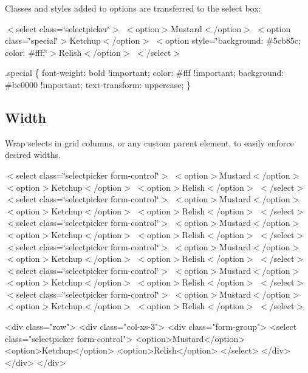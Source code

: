 Classes and styles added to options are transferred to the select box\+:

 $<$select class=\char`\"{}selectpicker\char`\"{}$>$ $<$option$>$Mustard$<$/option$>$ $<$option class=\char`\"{}special\char`\"{}$>$Ketchup$<$/option$>$ $<$option style=\char`\"{}background\+: \#5cb85c; color\+: \#fff;\char`\"{}$>$Relish$<$/option$>$ $<$/select$>$ 





\begin{DoxyCode}
.special \{
  font-weight: bold !important;
  color: #fff !important;
  background: #bc0000 !important;
  text-transform: uppercase;
\}
\end{DoxyCode}


\subsection*{Width}

Wrap selects in grid columns, or any custom parent element, to easily enforce desired widths.

    $<$select class=\char`\"{}selectpicker form-\/control\char`\"{}$>$ $<$option$>$Mustard$<$/option$>$ $<$option$>$Ketchup$<$/option$>$ $<$option$>$Relish$<$/option$>$ $<$/select$>$     $<$select class=\char`\"{}selectpicker form-\/control\char`\"{}$>$ $<$option$>$Mustard$<$/option$>$ $<$option$>$Ketchup$<$/option$>$ $<$option$>$Relish$<$/option$>$ $<$/select$>$       $<$select class=\char`\"{}selectpicker form-\/control\char`\"{}$>$ $<$option$>$Mustard$<$/option$>$ $<$option$>$Ketchup$<$/option$>$ $<$option$>$Relish$<$/option$>$ $<$/select$>$     $<$select class=\char`\"{}selectpicker form-\/control\char`\"{}$>$ $<$option$>$Mustard$<$/option$>$ $<$option$>$Ketchup$<$/option$>$ $<$option$>$Relish$<$/option$>$ $<$/select$>$       $<$select class=\char`\"{}selectpicker form-\/control\char`\"{}$>$ $<$option$>$Mustard$<$/option$>$ $<$option$>$Ketchup$<$/option$>$ $<$option$>$Relish$<$/option$>$ $<$/select$>$     $<$select class=\char`\"{}selectpicker form-\/control\char`\"{}$>$ $<$option$>$Mustard$<$/option$>$ $<$option$>$Ketchup$<$/option$>$ $<$option$>$Relish$<$/option$>$ $<$/select$>$    


\begin{DoxyCode}
<div class="row">
  <div class="col-xs-3">
    <div class="form-group">
      <select class="selectpicker form-control">
        <option>Mustard</option>
        <option>Ketchup</option>
        <option>Relish</option>
      </select>
    </div>
  </div>
</div>
\end{DoxyCode}




